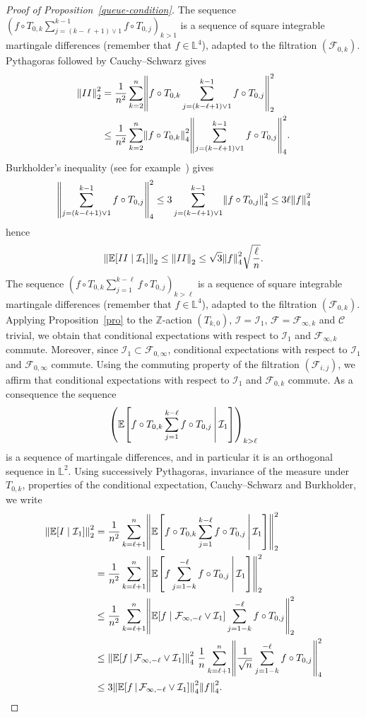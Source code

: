 \documentclass[10pt]{amsart}
\theoremstyle{definition}\newtheorem{defi}[theo]{Definition}\newtheorem{rema}[theo]{Remark}\newtheorem{exam}[theo]{Example}\newtheorem{exem}[theo]{Example}\newtheorem{nota}[theo]{Notation}
\newcommand{\Z}{\mathbb{Z}}
\newcommand*\bbL{\mathbb{L}}
\newcommand{\bbE}{\mathbb{E}}
\newcommand{\E}[1]{\bbE\left[#1\right]}
\newcommand*\I{\mathcal{I}}
\newcommand*\C{\mathcal{C}}
\newcommand*\F{\mathcal{F}}
\newcommand{\norm}[1]{\left\lVert #1\right\rVert}
\let\originalleft\left
\let\originalright\right
\renewcommand{\left}{\mathopen{}\mathclose\bgroup\originalleft}
\renewcommand{\right}{\aftergroup\egroup\originalright}
\begin{document}
\begin{proof}[Proof of Proposition~\ref{queue-condition}]
The sequence $(f \circ T_{0,k} \sum_{j=(k-\ell+1)\vee 1}^{k-1} f\circ T_{0,j})_{k>1}$ is a sequence of square integrable martingale differences (remember that $f\in \bbL^4$), adapted to the filtration $(\F_{0,k})$. Pythagoras followed by Cauchy--Schwarz gives
\begin{align*}
\norm{II}_2^2&= \frac1{n^2} \sum_{k=2}^{n} \norm{ f \circ T_{0,k}
\sum_{j=(k-\ell+1)\vee 1}^{k-1} f \circ T_{0,j}}_2^2\\
&\leq \frac1{n^2} \sum_{k=2}^{n}
\norm{f\circ T_{0,k}}_4^2\norm{\sum_{j=(k-\ell+1)\vee 1}^{k-1} f \circ T_{0,j}}_4^2.
\end{align*}
Burkholder's inequality (see for example~\cite{MR2472010}) gives
\[
\norm{\sum_{j=(k-\ell+1)\vee 1}^{k-1} f \circ T_{0,j}}_4^2\leq3\sum_{j=(k-\ell+1)\vee 1}^{k-1}\norm{f\circ T_{0,j}}_4^2\leq 3\ell\norm{f}_4^2
\]
hence
\begin{equation}\label{eq:controle_norme_II}
\norm{\E{II\mid\I_1}}_2\leq\norm{II}_2\leq \sqrt{3}\norm{f}_4^2\sqrt{\frac{\ell}{n}}.
\end{equation}
The sequence $(f \circ T_{0,k}
\sum_{j=1}^{k-\ell} f \circ T_{0,j})_{k>\ell}$ is a sequence of square integrable martingale differences (remember that $f\in \bbL^4$), adapted to the filtration $(\F_{0,k})$. Applying Proposition~\ref{pro} to the $\Z$-action $(T_{k,0})$, $\I=\I_1$, $\F=\F_{\infty,k}$ and $\C$ trivial, we obtain that conditional expectations with respect to $\I_1$ and $\F_{\infty,k}$ commute. Moreover, since $\I_1\subset\F_{0,\infty}$, conditional expectations with respect to $\I_1$ and $\F_{0,\infty}$ commute. Using the commuting property of the filtration $(\F_{i,j})$, we affirm that conditional expectations with respect to $\I_1$ and $\F_{0,k}$ commute. As a consequence the sequence
\[
\left(\E{f \circ T_{0,k}
\sum_{j=1}^{k-\ell} f \circ T_{0,j}\,\middle|\,\I_1}\right)_{k>\ell}
\]
is a sequence of martingale differences, and in particular it is an orthogonal sequence in $ \bbL^2$. Using successively Pythagoras, invariance of the measure under $T_{0,k}$, properties of the conditional expectation, Cauchy--Schwarz and Burkholder, we write
\begin{align*}
\norm{\E{I\mid\I_1}}_2^2&= \frac1{n^2} \sum_{k=\ell+1}^{n}
\norm{\E{f \circ T_{0,k} \sum_{j=1}^{k-\ell} f \circ T_{0,j}
\,\middle|\,\I_1}}_2^2\\
&=\frac1{n^2} \sum_{k=\ell+1}^{n}
\norm{\E{f \sum_{j=1-k}^{-\ell} f \circ T_{0,j}
\,\middle|\,\I_1}}_2^2\\
&\leq\frac1{n^2} \sum_{k=\ell+1}^{n}
\norm{\E{f\mid\F_{\infty,-\ell}\vee\I_1} \sum_{j=1-k}^{-\ell} f \circ T_{0,j} }_2^2\\
&\leq\norm{\E{f \,\middle|\,\F_{\infty,-\ell}\vee\I_1}}_4^2 \ \frac1n\sum_{k=\ell+1}^n\norm{\frac1{\sqrt n}\sum_{j=1-k}^{-\ell} f \circ T_{0,j}}_4^2\\
&\leq 3\norm{\E{f \,\middle|\,\F_{\infty,-\ell}\vee\I_1}}_4^2\norm{f}_4^2.
\end{align*}


\end{proof}
\end{document}
